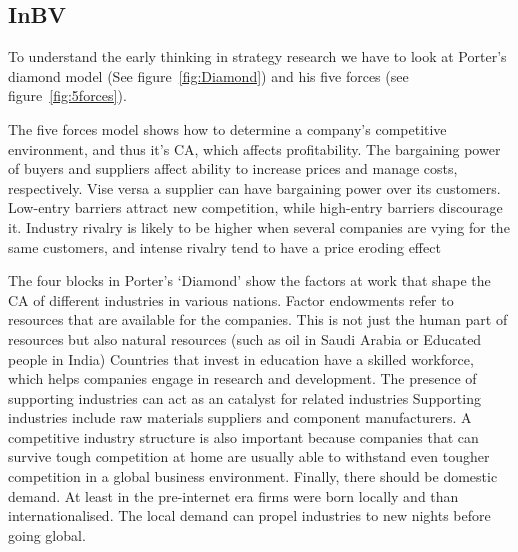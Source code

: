 \subsection{\glsdesc{InBV}} %

To understand the early thinking in strategy research we have to look at Porter's diamond model (See figure~\ref{fig:Diamond}) and his five forces (see figure~\ref{fig:5forces}).  


The five forces model shows how to determine a company's competitive environment, and thus it's \gls{CA}, which affects profitability. 
The bargaining power of buyers and suppliers affect ability to increase prices and manage costs, respectively. 
Vise versa a supplier can have bargaining power over its customers. Low-entry barriers attract new competition, while high-entry barriers discourage it. 
Industry rivalry is likely to be higher when several companies are vying for the same customers, and intense rivalry tend to have a price eroding effect

The four blocks in Porter's `Diamond' show the factors at work that shape the \gls{CA} of different industries in various nations.
Factor endowments refer to resources that are available for the companies. This is not just the human part of resources but also natural resources (such as oil in Saudi Arabia or Educated people in India)
Countries that invest in education have a skilled workforce, which helps companies engage in research and development. 
The presence of supporting industries can act as an catalyst for related industries
Supporting industries include raw materials suppliers and component manufacturers. 
A competitive industry structure is also important because companies that can survive tough competition at home are usually able to withstand even tougher competition in a global business environment.
Finally, there should be domestic demand. At least in the pre-internet era firms were born locally and than internationalised. The local demand can propel industries to new nights before going global.




